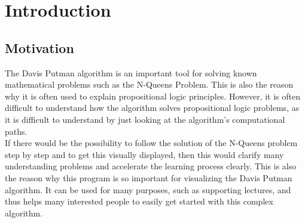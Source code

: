 
\chapter{Introduction}
\section{Motivation}
The Davis Putman algorithm is an important tool for solving known mathematical problems such as the N-Queens Problem. This is also the reason why it is often used to explain propositional logic principles. However, it is often difficult to understand how the algorithm solves propositional logic problems, as it is difficult to understand by just looking at the algorithm's computational paths.
\\
If there would be the possibility to follow the solution of the N-Queens problem step by step and to get this visually displayed, then this would clarify many understanding problems and accelerate the learning process clearly. This is also the reason why this program is so important for visualizing the Davis Putman algorithm. It can be used for many purposes, such as supporting lectures, and thus helps many interested people to easily get started with this complex algorithm.
